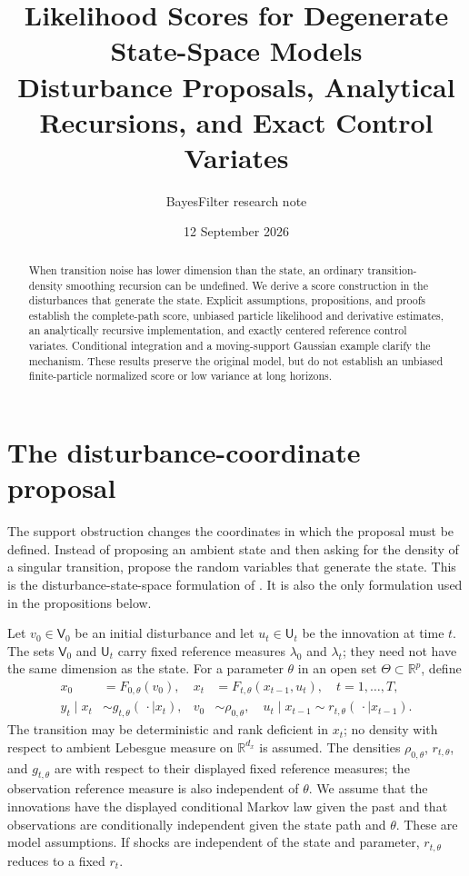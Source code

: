 \documentclass[11pt]{article}
\title{Likelihood Scores for Degenerate State-Space Models\\
Disturbance Proposals, Analytical Recursions, and Exact Control Variates}
\author{BayesFilter research note}
\date{12 September 2026}
\newcommand{\R}{\mathbb{R}}
\begin{document}
\maketitle
\begin{abstract}
When transition noise has lower dimension than the state, an ordinary
transition-density smoothing recursion can be undefined. We derive a score
construction in the disturbances that generate the state. Explicit
assumptions, propositions, and proofs establish the complete-path score,
unbiased particle likelihood and derivative estimates, an analytically
recursive implementation, and exactly centered reference control variates.
Conditional integration and a moving-support Gaussian example clarify the
mechanism. These results preserve the original model, but do not establish
an unbiased finite-particle normalized score or low variance at long horizons.
\end{abstract}
\section{The disturbance-coordinate proposal}

\label{sec:disturbance-proposal}

The support obstruction changes the coordinates in which the proposal must be
defined. Instead of proposing an ambient state and then asking for the density
of a singular transition, propose the random variables that generate the
state. This is the disturbance-state-space formulation of
\citet[Sections 1--2]{murray2018disturbance}. It is also the only formulation
used in the propositions below.

Let $v_0\in\mathsf V_0$ be an initial disturbance and let
$u_t\in\mathsf U_t$ be the innovation at time $t$. The sets
$\mathsf V_0$ and $\mathsf U_t$ carry fixed reference measures
$\lambda_0$ and $\lambda_t$; they need not have the same dimension as the
state. For a parameter $\theta$ in an open set $\Theta\subset\R^p$, define
\begin{align}
 x_0&=F_{0,\theta}(v_0), &
 x_t&=F_{t,\theta}(x_{t-1},u_t), \quad t=1,\ldots,T, 
 \label{eq:disturbance-state-map}\\
 y_t\mid x_t&\sim g_{t,\theta}(\,\cdot\mid x_t), &
 v_0&\sim\rho_{0,\theta}, \quad
 u_t\mid x_{t-1}\sim r_{t,\theta}(\,\cdot\mid x_{t-1}).
 \label{eq:disturbance-model}
\end{align}
The transition may be deterministic and rank deficient in $x_t$; no density
with respect to ambient Lebesgue measure on $\R^{d_x}$ is assumed. The
densities $\rho_{0,\theta}$, $r_{t,\theta}$, and $g_{t,\theta}$ are with
respect to their displayed fixed reference measures; the observation
reference measure is also independent of $\theta$. We assume that the
innovations have the displayed conditional Markov law given the past and
that observations are conditionally independent given the state path and
$\theta$. These are model assumptions. If shocks are independent of the state
and parameter, $r_{t,\theta}$ reduces to a fixed $r_t$.
\end{document}
